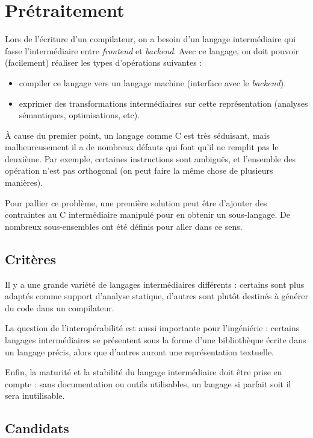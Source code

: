 \documentclass{article}
\begin{document}
\section{Prétraitement}

Lors de l'écriture d'un compilateur, on a besoin d'un langage
intermédiaire qui fasse l'intermédiaire entre \emph{frontend} et
\emph{backend}. Avec ce langage, on doit pouvoir (facilement) réaliser
les types d'opérations suivantes :

\begin{itemize}
\item
  compiler ce langage vers un langage machine (interface avec le
  \emph{backend}).
\item
  exprimer des transformations intermédiaires sur cette représentation
  (analyses sémantiques, optimisations, etc).
\end{itemize}
À cause du premier point, un langage comme C est très séduisant, mais
malheureusement il a de nombreux défauts qui font qu'il ne remplit pas
le deuxième. Par exemple, certaines instructions sont ambiguës, et
l'ensemble des opération n'est pas orthogonal (on peut faire la même
chose de plusieurs manières).

Pour pallier ce problème, une première solution peut être d'ajouter des
contraintes au C intermédiaire manipulé pour en obtenir un sous-langage.
De nombreux sous-ensembles ont été définis pour aller dans ce sens.

\subsection{Critères}

Il y a une grande variété de langages intermédiaires différents : certains sont
plus adaptés comme support d'analyse statique, d'autres sont plutôt destinés à
générer du code dans un compilateur.

La question de l'interopérabilité est aussi importante pour l'ingéniérie :
certains langages intermédiaires se présentent sous la forme d'une bibliothèque
écrite dans un langage précis, alors que d'autres auront une représentation
textuelle.

Enfin, la maturité et la stabilité du langage intermédiaire doit être prise en
compte : sans documentation ou outils utilisables, un langage si parfait soit il
sera inutilisable.

\subsection{Candidats}
\end{document}
